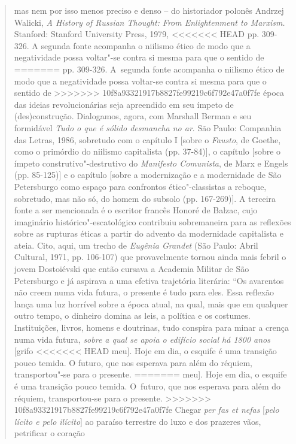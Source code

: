 {\begin{quote}
{  mas nem por isso menos preciso e denso -- do historiador polonês
  Andrzej Walicki, \emph{A History of Russian Thought: From
  Enlightenment to Marxism.} Stanford: Stanford University Press, 1979,
<<<<<<< HEAD
  pp. 309-326. A segunda fonte acompanha o niilismo ético de modo que a
  negatividade possa voltar"-se contra si mesma para que o sentido de
=======
  pp. 309-326. A~segunda fonte acompanha o niilismo ético de modo que a
  negatividade possa voltar-se contra si mesma para que o sentido de
>>>>>>> 10f8a93321917b8827fe99219c6f792e47a0f7fe
  época das ideias revolucionárias seja apreendido em seu ímpeto de
  (des)construção. Dialogamos, agora, com Marshall Berman e seu
  formidável \emph{Tudo o que é sólido desmancha no ar}. São Paulo:
  Companhia das Letras, 1986, sobretudo com o capítulo I {[}sobre o
  \emph{Fausto}, de Goethe, como o primórdio do niilismo capitalista
  (pp. 37-84){]}, o capítulo  {[}sobre o ímpeto construtivo"-destrutivo
  do \emph{Manifesto Comunista}, de Marx e Engels (pp. 85-125){]} e o
  capítulo  {[}sobre a modernização e a modernidade de São
  Petersburgo como espaço para confrontos ético"-classistas a reboque,
  sobretudo, mas não só, do homem do subsolo (pp. 167-269){]}. A
  terceira fonte a ser mencionada é o escritor francês Honoré de Balzac,
  cujo imaginário histórico"-escatológico contribuiu sobremaneira para as
  reflexões sobre as rupturas éticas a partir do advento da modernidade
  capitalista e ateia. Cito, aqui, um trecho de \emph{Eugênia Grandet}
  (São Paulo: Abril Cultural, 1971, pp. 106-107) que provavelmente
  tornou ainda mais febril o jovem Dostoiévski que então cursava a
  Academia Militar de São Petersburgo e já aspirava a uma efetiva
  trajetória literária: ``Os avarentos não creem numa vida futura, o
  presente é tudo para eles. Essa reflexão lança uma luz horrível sobre
  a época atual, na qual, mais que em qualquer outro tempo, o dinheiro
  domina as leis, a política e os costumes. Instituições, livros, homens
  e doutrinas, tudo conspira para minar a crença numa vida futura,
  \emph{sobre a qual se apoia o edifício social há 1800 anos} {[}grifo
<<<<<<< HEAD
  meu{]}. Hoje em dia, o esquife é uma transição pouco temida. O futuro,
  que nos esperava para além do réquiem, transportou"-se para o presente.
=======
  meu{]}. Hoje em dia, o esquife é uma transição pouco temida. O~futuro,
  que nos esperava para além do réquiem, transportou-se para o presente.
>>>>>>> 10f8a93321917b8827fe99219c6f792e47a0f7fe
  Chegar \emph{per fas et nefas} {[}\emph{pelo lícito e pelo ilícito}{]}
  ao paraíso terrestre do luxo e dos prazeres vãos, petrificar o coração
}
\end{quote}}
